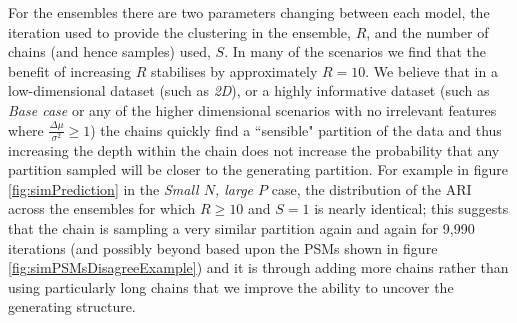\documentclass[]{article}
\begin{document}
For the ensembles there are two parameters changing between each model, the iteration used to provide the clustering in the ensemble, $R$, and the number of chains (and hence samples) used, $S$. In many of the scenarios we find that the benefit of increasing $R$ stabilises by approximately $R = 10$. We believe that in a low-dimensional dataset (such as \emph{2D}), or a highly informative dataset (such as \emph{Base case} or any of the higher dimensional scenarios with no irrelevant features where $\frac{\Delta \mu}{\sigma^2} \geq 1$) the chains quickly find a ``sensible" partition of the data and thus increasing the depth within the chain does not increase the probability that any partition sampled will be closer to the generating partition. For example in figure \ref{fig:simPrediction} in the \emph{Small $N$, large $P$} case, the distribution of the ARI across the ensembles for which $R\geq10$ and $S=1$ is nearly identical; this suggests that the chain is sampling a very similar partition again and again for 9,990 iterations (and possibly beyond based upon the PSMs shown in figure \ref{fig:simPSMsDisagreeExample}) and it is through adding more chains rather than using particularly long chains that we improve the ability to uncover the generating structure. 
\end{document}
